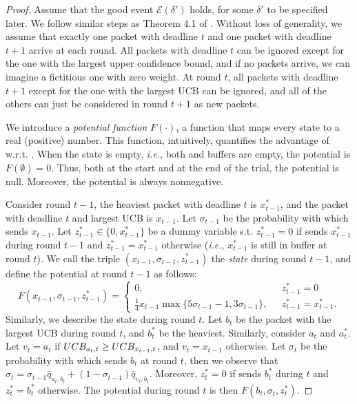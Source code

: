 \upperboundlearnrandomtwo*
\begin{proof}
    Assume that the good event $\mathcal{E}(\delta')$ holds, for some $\delta'$ to be specified later. We follow similar steps as Theorem 4.1 of \cite{bienkowski2011randomized}. Without loss of generality, we assume that exactly one packet with deadline $t$ and one packet with deadline $t+1$ arrive at each round. All packets with deadline $t$ can be ignored except for the one with the largest upper confidence bound, and if no packets arrive, we can imagine a fictitious one with zero weight. At round $t$, all packets with deadline $t+1$ except for the one with the largest UCB can be ignored, and all of the others can just be considered in round $t+1$ as new packets. 
    
    We introduce a \textit{potential function} $F(\cdot)$, a function that maps every state to a real (positive) number. This function, intuitively, quantifies the advantage of \algrtwo w.r.t. \opt. When the state is empty, \emph{i.e.}, both \algrtwo and \opt buffers are empty, the potential is $F(\emptyset) = 0$. Thus, both at the start and at the end of the trial, the potential is null. Moreover, the potential is always nonnegative.
    
    Consider round $t-1$, the heaviest packet with deadline $t$ is $x_{t-1}^*$, and the packet with deadline $t$ and largest UCB is $x_{t-1}$. Let $\sigma_{t-1}$ be the probability with which \algrtwo sends $x_{t-1}$. Let $z_{t-1}^* \in \{0, x_{t-1}^*\}$ be a dummy variable s.t. $z_{t-1}^* = 0$ if \opt sends $x_{t-1}^*$ during round $t-1$ and $z_{t-1}^* = x_{t-1}^*$ otherwise (\emph{i.e.}, $x_{t-1}^*$ is still in \opt buffer at round $t$). We call the triple $(x_{t-1}, \sigma_{t-1}, z_{t-1}^*)$ the \textit{state} during round $t-1$, and define the potential at round $t-1$ as follows:
    \begin{equation}
        F(x_{t-1}, \sigma_{t-1}, z_{t-1}^*) = \begin{cases}
        0, ~~~&z_{t-1}^* = 0 \\
        \frac{1}{4}x_{t-1}\max\{5\sigma_{t-1}-1, 3\sigma_{t-1}\},~~~&z_{t-1}^* = x_{t-1}^*.
        \end{cases}
    \end{equation}
    Similarly, we describe the state during round $t$. Let $b_t$ be the packet with the largest UCB during round $t$, and $b_t^*$ be the heaviest. Similarly, consider $a_t$ and $a_t^*$. Let $v_t = a_t$ if $UCB_{a_t, t} \ge UCB_{x_{t-1},t}$, and $v_t = x_{t-1}$ otherwise. Let $\sigma_t$ be the probability with which \algrtwo sends $b_t$ at round $t$, then we observe that $\sigma_t = \sigma_{t-1}\widehat{q}_{a_t, b_t} + (1-\sigma_{t-1})\widehat{q}_{v_t, b_t}$. Moreover, $z_t^*=0$ if \opt sends $b_t^*$ during $t$ and $z_t^*=b_t^*$ otherwise. The potential during round $t$ is then $F(b_{t}, \sigma_{t}, z_{t}^*)$.


\end{proof}
